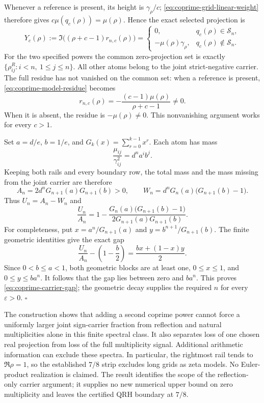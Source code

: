Whenever a reference is present, its height is \(\gamma_\rho/c\);
\eqref{eq:coprime-grid-linear-weight} therefore gives
\(c\mu(q_c(\rho))=\mu(\rho)\). Hence the exact selected projection is
\[
 Y_c(\rho):=\Im\bigl((\rho+c-1)r_{n,c}(\rho)\bigr)
 =
 \begin{cases}
 0,&q_c(\rho)\in\mathcal S_n,\\
 -\mu(\rho)\gamma_\rho,&q_c(\rho)\notin\mathcal S_n.
 \end{cases}
\]
For the two specified powers the common zero-projection set is exactly
\(\{\rho^R_{ij}:i<n,\ 1\le j\le n\}\).
All other atoms belong to the joint strict-negative carrier.
The full residue has not vanished on the common set: when a reference
is present, \eqref{eq:coprime-model-residue} becomes
\[
 r_{n,c}(\rho)=-\frac{(c-1)\mu(\rho)}{\rho+c-1}\ne0.
\]
When it is absent, the residue is \(-\mu(\rho)\ne0\).
This nonvanishing argument works for every \(c>1\).

Set \(a=d/e\), \(b=1/e\), and
\(G_k(x)=\sum_{r=0}^{k-1}x^r\).
Each atom has mass
\[
 \frac{\mu_{ij}}{\gamma_{ij}^2}=d^n a^i b^j.
\]
Keeping both rails and every boundary row, the total mass and the mass
missing from the joint carrier are therefore
\[
 A_n=2d^nG_{n+1}(a)G_{n+1}(b)>0,\qquad
 W_n=d^nG_n(a)\bigl(G_{n+1}(b)-1\bigr).
\]
Thus \(U_n=A_n-W_n\) and
\[
 \frac{U_n}{A_n}
 =1-\frac{G_n(a)\bigl(G_{n+1}(b)-1\bigr)}
            {2G_{n+1}(a)G_{n+1}(b)}.
\]
For completeness, put
\(x=a^n/G_{n+1}(a)\) and
\(y=b^{n+1}/G_{n+1}(b)\).
The finite geometric identities give the exact gap
\[
 \frac{U_n}{A_n}-\left(1-\frac b2\right)
 =\frac{b x+(1-x)y}{2}.
\]
Since \(0<b\le a<1\), both geometric blocks are at least one,
\(0\le x\le1\), and \(0\le y\le b a^n\).
It follows that the gap lies between zero and \(b a^n\).
This proves \eqref{eq:coprime-carrier-gap}; the geometric decay supplies
the required \(n\) for every \(\varepsilon>0\). \(\square\)

The construction shows that adding a second coprime power cannot force
a uniformly larger joint sign-carrier fraction from reflection and
natural multiplicities alone in this finite spectral class.
It also separates loss of one chosen real projection from loss of the
full multiplicity signal. Additional arithmetic information can exclude these spectra. In particular,
the rightmost rail tends to \(\Re\rho=1\), so the established \(7/8\)
strip excludes long grids as zeta models. No Euler-product realization
is claimed. The result identifies the scope of the reflection-only
carrier argument; it supplies no new numerical upper bound on zero
multiplicity and leaves the certified QRH boundary at \(7/8\).

